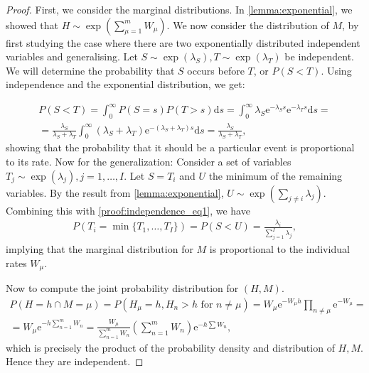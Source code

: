 \documentclass[10pt,a4paper]{article}
\begin{document}
\begin{proof}
	First, we consider the marginal distributions. In \cref{lemma:exponential}, we showed that $H \sim \exp \left( \sum_{\mu = 1}^m W_\mu \right)$. We now consider the distribution of $M$, by first studying the case where there are two exponentially distributed independent variables and generalising. Let $S \sim \exp \left( \lambda_S \right), T \sim \exp \left( \lambda_T \right)$ be independent. We will determine the probability that $S$ occurs before $T$, or $P ( S < T )$. Using independence and the exponential distribution, we get:
	
	\begin{align}
		P \left( S < T \right) = \int_0^\infty P ( S = s) P (T > s) \mathrm{d}s = \int_0^\infty \lambda_S \mathrm{e}^{- \lambda_S s} \mathrm{e}^{-\lambda_T s} \mathrm{d}s = \\
		= \frac{\lambda_S}{\lambda_S + \lambda_T} \int_0^\infty (\lambda_S + \lambda_T ) \mathrm{e}^{-(\lambda_S + \lambda_T)s} \mathrm{d}s = \frac{\lambda_S}{\lambda_S + \lambda_T}, \label{proof:independence_eq1}
	\end{align}
	showing that the probability that it should be a particular event is proportional to its rate. Now for the generalization: Consider a set of variables $T_j \sim \exp \left( \lambda_j \right), j = 1, \ldots, I$. Let $S = T_i$ and $U$ the minimum of the remaining variables. By the result from \cref{lemma:exponential}, $U \sim \exp ( \sum_{j \neq i} \lambda_j)$. Combining this with \cref{proof:independence_eq1}, we have
	\begin{align}
		P \left( T_i = \min \{ T_1, \ldots, T_I \} \right) = P \left( S < U \right) = \frac{\lambda_i}{\sum_{j = 1}^{I} \lambda_j},
	\end{align}
	implying that the marginal distribution for $M$ is proportional to the individual rates $W_\mu$.
	
	Now to compute the joint probability distribution for $(H, M)$.
	\begin{align*}
		P \left( H = h \cap M = \mu \right) = P \left( H_\mu = h, H_n > h \textrm{ for } n \neq \mu \right) = W_\mu \textrm{e}^{- W_\mu h} \prod_{n \neq \mu} \textrm{e}^{-W_\mu } = \\
		= W_\mu \textrm{e}^{- h \sum_{n=1}^m W_n} = \frac{W_\mu}{\sum_{n = 1}^m W_n} \left( \sum_{n=1}^m W_n \right) \textrm{e}^{-h\sum W_n},
	\end{align*}
	which is precisely the product of the probability density and distribution of $H, M$.  Hence they are independent.
\end{proof}
\end{document}
